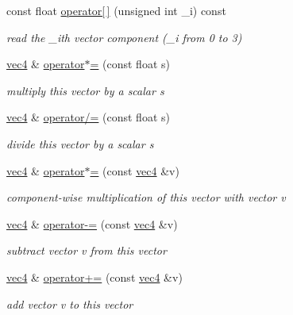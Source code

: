 \begin{DoxyCompactItemize}
const float \hyperlink{classvec4_ad26676799641dfe9033d3715423ade8d}{operator\mbox{[}$\,$\mbox{]}} (unsigned int \+\_\+i) const 
\begin{DoxyCompactList}\small\item\em read the \+\_\+i\textquotesingle{}th vector component (\+\_\+i from 0 to 3) \end{DoxyCompactList}\item 
\hyperlink{classvec4}{vec4} \& \hyperlink{classvec4_ac97789260e6386514fe8586d2e7db372}{operator$\ast$=} (const float s)
\begin{DoxyCompactList}\small\item\em multiply this vector by a scalar {\ttfamily s} \end{DoxyCompactList}\item 
\hyperlink{classvec4}{vec4} \& \hyperlink{classvec4_aaebb986a13f6d696f7c7554e564ce85a}{operator/=} (const float s)
\begin{DoxyCompactList}\small\item\em divide this vector by a scalar {\ttfamily s} \end{DoxyCompactList}\item 
\hyperlink{classvec4}{vec4} \& \hyperlink{classvec4_a0c2976559fb5c6c0c3864071c0a3bdad}{operator$\ast$=} (const \hyperlink{classvec4}{vec4} \&v)
\begin{DoxyCompactList}\small\item\em component-\/wise multiplication of this vector with vector {\ttfamily v} \end{DoxyCompactList}\item 
\hyperlink{classvec4}{vec4} \& \hyperlink{classvec4_a7b7f91f9ae6a8dce5404be6eb7ee4c41}{operator-\/=} (const \hyperlink{classvec4}{vec4} \&v)
\begin{DoxyCompactList}\small\item\em subtract vector {\ttfamily v} from this vector \end{DoxyCompactList}\item 
\hyperlink{classvec4}{vec4} \& \hyperlink{classvec4_a32b3157d2fd121ac428b3e25bdd03d5f}{operator+=} (const \hyperlink{classvec4}{vec4} \&v)
\begin{DoxyCompactList}\small\item\em add vector {\ttfamily v} to this vector \end{DoxyCompactList}\end{DoxyCompactItemize}
